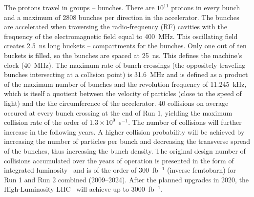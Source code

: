 The protons travel in groups -- bunches. There are $10^{11}$ protons in every bunch and a maximum of 2808 bunches per direction in the accelerator. The bunches are accelerated when traversing the radio-frequency (RF) cavities with the frequency of the electromagnetic field equal to 400~MHz. This oscillating field creates 2.5~ns long buckets -- compartments for the bunches. Only one out of ten buckets is filled, so the bunches are spaced at 25~ns. This defines the machine's clock (40~MHz). The maximum rate of bunch crossings (the oppositely traveling bunches intersecting at a collision point) is 31.6~MHz and is defined as a product of the maximum number of bunches and the revolution frequency of 11.245~kHz, which is itself a quotient between the velocity of particles (close to the speed of light) and the the circumference of the accelerator. 40 collisions on average occured at every bunch crossing at the end of Run 1, yielding the maximum collision rate of the order of $1.3\times10^9$~s$^{-1}$. The number of collisions will further increase in the following years. A higher collision probability will be achieved by increasing the number of particles per bunch and decreasing the transverse spread of the bunches, thus increasing the bunch density. The original design number of collisions accumulated over the years of operation is presented in the form of integrated luminosity~\cite{Herr:1625184} and is of the order of 300~fb$^{-1}$ (inverse femtobarn) for Run 1 and Run 2 combined (2009--2024). After the planned upgrades in 2020, the High-Luminosity LHC~\cite{BejarAlonso:2069130} will achieve up to 3000~fb$^{-1}$.

